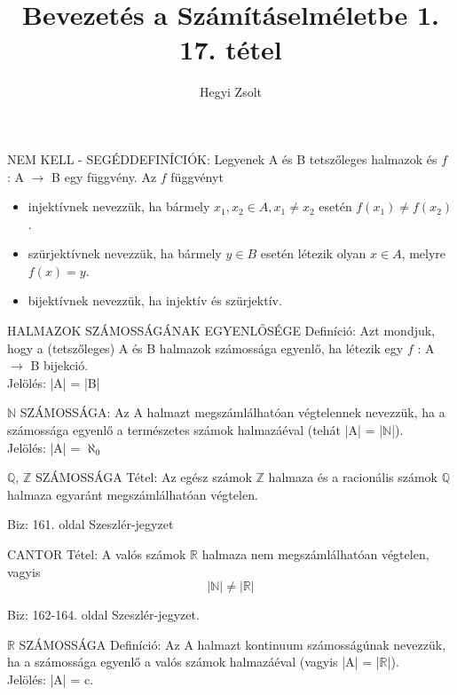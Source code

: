 \documentclass[]{article}
\title{Bevezetés a Számításelméletbe 1.\\{\large 17. tétel}}
\author{Hegyi Zsolt}
\begin{document}
\maketitle{}
\begin{shaded}
NEM KELL - SEGÉDDEFINÍCIÓK: Legyenek A és B tetszőleges halmazok és $f$ : A $\to$ B egy függvény. Az $f$ függvényt
\begin{itemize}
\item injektívnek nevezzük, ha bármely $x_1, x_2 \in A, x_1 \neq x_2$ esetén $f(x_1) \neq f(x_2)$.
\item szürjektívnek nevezzük, ha bármely $y \in B$ esetén létezik olyan $x \in A$, melyre $f(x) = y$.
\item bijektívnek nevezzük, ha injektív és szürjektív.
\end{itemize}
\end{shaded}
\begin{shaded}
HALMAZOK SZÁMOSSÁGÁNAK EGYENLŐSÉGE Definíció: Azt mondjuk, hogy a (tetszőleges) A és B halmazok számossága egyenlő, ha létezik egy $f$ : A $\to$ B bijekció.\\
Jelölés: |A| = |B|
\end{shaded}
\begin{shaded}
$\mathbb{N}$ SZÁMOSSÁGA: Az A halmazt megszámlálhatóan végtelennek nevezzük, ha a számossága egyenlő a természetes számok halmazáéval (tehát |A| = |$\mathbb{N}$|).\\
Jelölés: |A| = $\aleph_0$
\end{shaded}
\begin{framed}
$\mathbb{Q}$, $\mathbb{Z}$ SZÁMOSSÁGA Tétel: Az egész számok $\mathbb{Z}$ halmaza és a racionális számok $\mathbb{Q}$ halmaza egyaránt megszámlálhatóan végtelen.
\end{framed}
\begin{leftbar}
Biz: 161. oldal Szeszlér-jegyzet
\end{leftbar}
\begin{framed}
CANTOR Tétel: A valós számok $\mathbb{R}$ halmaza nem megszámlálhatóan végtelen, vagyis $$|\mathbb{N}| \neq |\mathbb{R}|$$
\end{framed}
\begin{leftbar}
Biz: 162-164. oldal Szeszlér-jegyzet.
\end{leftbar}
\begin{shaded}
$\mathbb{R}$ SZÁMOSSÁGA Definíció: Az A halmazt kontinuum számosságúnak nevezzük, ha a számossága egyenlő a valós számok halmazáéval (vagyis |A| = |$\mathbb{R}$|).\\
Jelölés: |A| = c.
\end{shaded}
\end{document}
